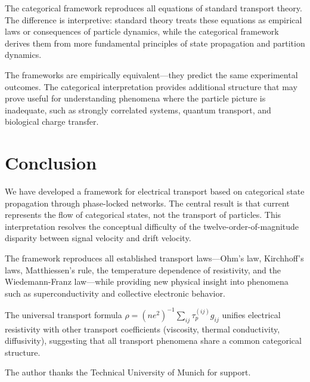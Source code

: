 \documentclass[twocolumn,showpacs,preprintnumbers,amsmath,amssymb,prd]{revtex4-2}
\newcommand{\taup}{\tau_p}
\begin{document}
The categorical framework reproduces all equations of standard transport theory. The difference is interpretive: standard theory treats these equations as empirical laws or consequences of particle dynamics, while the categorical framework derives them from more fundamental principles of state propagation and partition dynamics.

The frameworks are empirically equivalent---they predict the same experimental outcomes. The categorical interpretation provides additional structure that may prove useful for understanding phenomena where the particle picture is inadequate, such as strongly correlated systems, quantum transport, and biological charge transfer.

\section{Conclusion}

We have developed a framework for electrical transport based on categorical state propagation through phase-locked networks. The central result is that current represents the flow of categorical states, not the transport of particles. This interpretation resolves the conceptual difficulty of the twelve-order-of-magnitude disparity between signal velocity and drift velocity.

The framework reproduces all established transport laws---Ohm's law, Kirchhoff's laws, Matthiessen's rule, the temperature dependence of resistivity, and the Wiedemann-Franz law---while providing new physical insight into phenomena such as superconductivity and collective electronic behavior.

The universal transport formula $\rho = (ne^2)^{-1}\sum_{ij}\taup^{(ij)}g_{ij}$ unifies electrical resistivity with other transport coefficients (viscosity, thermal conductivity, diffusivity), suggesting that all transport phenomena share a common categorical structure.

\begin{acknowledgments}
The author thanks the Technical University of Munich for support.
\end{acknowledgments}


\end{document}
